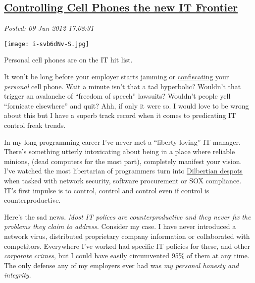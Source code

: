 %

\subsection*{\href{https://bakerjd99.wordpress.com/2012/06/09/controlling-cell-phones-the-new-it-frontier/}{Controlling Cell Phones the new IT Frontier}}


\noindent\emph{Posted: 09 Jun 2012 17:08:31}
\vspace{6pt}



\captionsetup[floatingfigure]{labelformat=empty}
\begin{floatingfigure}[l]{0.25\textwidth}
\centering
\texttt{[image: i-svb6dNv-S.jpg]}
\caption{Personal cell phones are on the IT hit list.}
\label{fig:2934X0}
\end{floatingfigure} It won't be long before your employer starts jamming or
\href{http://newsfeed.time.com/2012/05/15/obama-campaign-bans-cell-phones-at-private-fundraisers/}{confiscating}
your \emph{personal} cell phone. Wait a minute isn't that a tad
hyperbolic? Wouldn't that trigger an avalanche of ``freedom of speech''
lawsuits? Wouldn't people yell ``fornicate elsewhere'' and quit? Ahh, if
only it were so. I would love to be wrong about this but I have a superb
track record when it comes to predicating IT control freak trends.

In my long programming career I've never met a ``liberty loving'' IT
manager. There's something utterly intoxicating about being in a place
where reliable minions, (dead computers for the most part), completely
manifest your vision. I've watched the most libertarian of programmers
turn into \href{http://dilbert.com/strips/comic/2010-09-13/}{Dilbertian
despots} when tasked with network security, software procurement or SOX
compliance. IT's first impulse is to control, control and control even
if control is counterproductive.

Here's the sad news. \emph{Most IT polices are counterproductive and
they never fix the problems they claim to address.} Consider my case. I
have never introduced a network virus, distributed proprietary company
information or collaborated with competitors. Everywhere I've worked had
specific IT policies for these, and other \emph{corporate crimes}, but I
could have easily circumvented 95\% of them at any time. The only
defense any of my employers ever had was \emph{my personal honesty and
integrity}.

